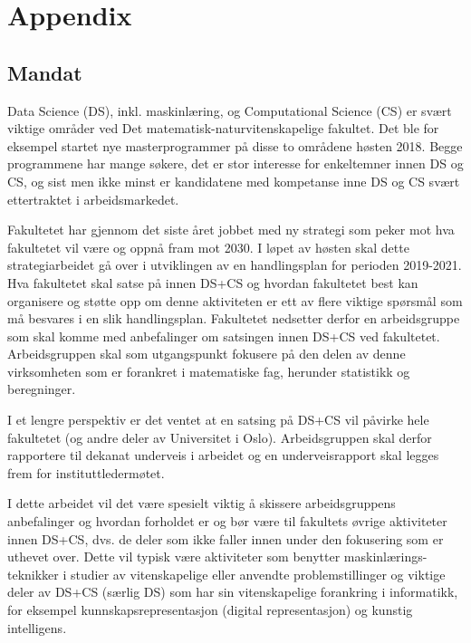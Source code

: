 \documentclass[a4paper,10pt]{article}
\begin{document}
\appendix
\section{Appendix}
\subsection{Mandat}\label{ap:mandat}

Data Science (DS), inkl. maskinlæring, og Computational Science (CS) er svært viktige
områder ved Det matematisk-naturvitenskapelige fakultet. Det ble for eksempel startet
nye masterprogrammer på disse to områdene høsten 2018. Begge programmene har mange
søkere, det er stor interesse for enkeltemner innen DS og CS, og sist men ikke minst er
kandidatene med kompetanse inne DS og CS svært ettertraktet i arbeidsmarkedet.

Fakultetet har gjennom det siste året jobbet med ny strategi som peker mot hva
fakultetet vil være og oppnå fram mot 2030. I løpet av høsten skal dette strategiarbeidet
gå over i utviklingen av en handlingsplan for perioden 2019-2021. Hva fakultetet skal satse
på innen DS+CS og hvordan fakultetet best kan organisere og støtte opp om denne
aktiviteten er ett av flere viktige spørsmål som må besvares i en slik handlingsplan.
Fakultetet nedsetter derfor en arbeidsgruppe som skal komme med anbefalinger om
satsingen innen DS+CS ved fakultetet. Arbeidsgruppen skal som utgangspunkt fokusere
på den delen av denne virksomheten som er forankret i matematiske fag, herunder
statistikk og beregninger.

I et lengre perspektiv er det ventet at en satsing på DS+CS vil påvirke hele fakultetet (og
andre deler av Universitet i Oslo). Arbeidsgruppen skal derfor rapportere til dekanat
underveis i arbeidet og en underveisrapport skal legges frem for instituttledermøtet.

I dette arbeidet vil det være spesielt viktig å skissere arbeidsgruppens anbefalinger og
hvordan forholdet er og bør være til fakultets øvrige aktiviteter innen DS+CS, dvs. de deler
som ikke faller innen under den fokusering som er uthevet over. Dette vil typisk være
aktiviteter som benytter maskinlærings-teknikker i studier av vitenskapelige eller anvendte
problemstillinger og viktige deler av DS+CS (særlig DS) som har sin vitenskapelige
forankring i informatikk, for eksempel kunnskapsrepresentasjon (digital representasjon) og
kunstig intelligens.
\end{document}
